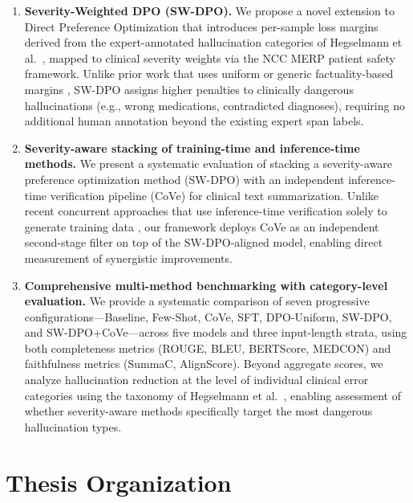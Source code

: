 \documentclass[12pt,a4paper,oneside]{report}
\begin{document}
\begin{enumerate}[label=\textbf{C\arabic*:}, leftmargin=3em]
    \item \textbf{Severity-Weighted DPO (SW-DPO).} We propose a novel extension to Direct Preference Optimization that introduces per-sample loss margins derived from the expert-annotated hallucination categories of Hegselmann et al.~\cite{hegselmann2024datacentric}, mapped to clinical severity weights via the NCC MERP patient safety framework. Unlike prior work that uses uniform \cite{rafailov2023dpo} or generic factuality-based margins \cite{chaduvula2026fdpo}, SW-DPO assigns higher penalties to clinically dangerous hallucinations (e.g., wrong medications, contradicted diagnoses), requiring no additional human annotation beyond the existing expert span labels.
    
    \item \textbf{Severity-aware stacking of training-time and inference-time methods.} We present a systematic evaluation of stacking a severity-aware preference optimization method (SW-DPO) with an independent inference-time verification pipeline (CoVe) for clinical text summarization. Unlike recent concurrent approaches that use inference-time verification solely to generate training data \cite{liu2025veridpo, fang2025hdsrpl}, our framework deploys CoVe as an independent second-stage filter on top of the SW-DPO-aligned model, enabling direct measurement of synergistic improvements.
    
    \item \textbf{Comprehensive multi-method benchmarking with category-level evaluation.} We provide a systematic comparison of seven progressive configurations---Baseline, Few-Shot, CoVe, SFT, DPO-Uniform, SW-DPO, and SW-DPO+CoVe---across five models and three input-length strata, using both completeness metrics (ROUGE, BLEU, BERTScore, MEDCON) and faithfulness metrics (SummaC, AlignScore). Beyond aggregate scores, we analyze hallucination reduction at the level of individual clinical error categories using the taxonomy of Hegselmann et al.~\cite{hegselmann2024datacentric}, enabling assessment of whether severity-aware methods specifically target the most dangerous hallucination types.
\end{enumerate}

\section{Thesis Organization}
\label{sec:organization}
\end{document}
